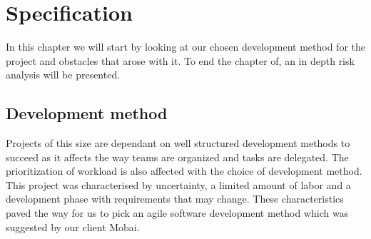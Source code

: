 \chapter{Specification}
\label{chap:Specification}
In this chapter we will start by looking at our chosen development method for the project and obstacles that arose with it. To end the chapter of, an in depth risk analysis will be presented.


\section{Development method}
Projects of this size are dependant on well structured development methods to succeed as it affects the way teams are organized and tasks are delegated. The prioritization of workload is also affected with the choice of development method. 
This project was characterised by uncertainty, a limited amount of labor and a development phase with requirements that may change. These characteristics paved the way for us to pick an agile software development method which was suggested by our client Mobai.  
